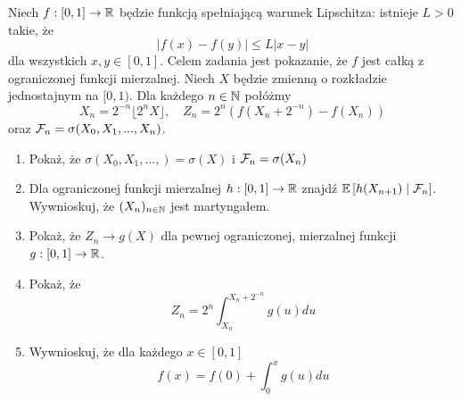 \begin{problem}
  Niech $f:[0,1]\to\operatorname{\mathbb{R}}$ będzie funkcją spełniającą warunek Lipschitza: istnieje $L>0$ takie, że
  $$|f(x)-f(y)|\leq L|x-y|$$
  dla wszystkich $x,y\in[0,1]$. Celem zadania jest pokazanie, że $f$ jest całką z ograniczonej funkcji mierzalnej. Niech $X$ będzie zmienną o rozkładzie jednostajnym na $[0,1)$. Dla każdego $n\in\operatorname{\mathbb{N}}$ połóżmy
  $$X_n=2^{-n}\lfloor 2^nX\rfloor,\quad Z_n=2^n(f(X_n+2^{-n}) - f(X_n))$$
  oraz $\mathcal{F}_n=\sigma(X_0,X_1,...,X_n)$.
  \begin{enumerate}[label=(\alph*)]
    \item Pokaż, że $\sigma(X_0,X_1,...,)=\sigma(X)$ i $\mathcal{F}_n=\sigma(X_n)$
    \item Dla ograniczonej funkcji mierzalnej $h:[0,1]\to\operatorname{\mathbb{R}}$ znajdź $\expected{h(X_{n+1})}{\set{F}_n}$. Wywnioskuj, że $(X_n)_{n\in\operatorname{\mathbb{N}}}$ jest martyngałem.
    \item Pokaż, że $Z_n\to g(X)$ dla pewnej ograniczonej, mierzalnej funkcji $g:[0,1]\to\operatorname{\mathbb{R}}$.
    \item Pokaż, że
      $$Z_n=2^n\int_{X_n}^{X_n+2^{-n}}g(u)du$$
    \item Wywnioskuj, że dla każdego $x\in[0,1]$ 
      $$f(x)=f(0)+\int_0^x g(u)du$$
  \end{enumerate}
\end{problem}

